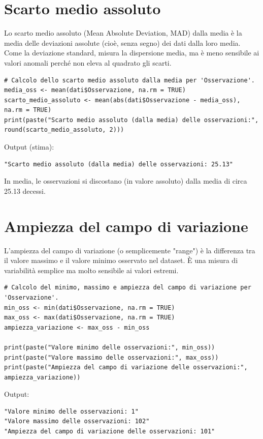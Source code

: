 \documentclass[14pt, openany, titlepage]{report} %
\begin{document}
\section{Scarto medio assoluto}
Lo scarto medio assoluto (Mean Absolute Deviation, MAD)
 dalla media è la media delle deviazioni assolute (cioè, senza segno)
  dei dati dalla loro media. Come la deviazione standard, 
  misura la dispersione media, ma è meno sensibile ai valori 
  anomali perché non eleva al quadrato gli scarti.
\begin{center}
\begin{lstlisting}[breaklines=true]
# Calcolo dello scarto medio assoluto dalla media per 'Osservazione'.
media_oss <- mean(dati$Osservazione, na.rm = TRUE)
scarto_medio_assoluto <- mean(abs(dati$Osservazione - media_oss), na.rm = TRUE)
print(paste("Scarto medio assoluto (dalla media) delle osservazioni:", round(scarto_medio_assoluto, 2)))
\end{lstlisting}
\end{center}
\noindent
Output (stima):
\begin{verbatim}
"Scarto medio assoluto (dalla media) delle osservazioni: 25.13"
\end{verbatim}
In media, le osservazioni si discostano (in valore assoluto) 
dalla media di circa 25.13 decessi.

\section{Ampiezza del campo di variazione}
L'ampiezza del campo di variazione (o semplicemente "range") 
è la differenza tra il valore massimo e il valore minimo osservato 
nel dataset. È una misura di variabilità semplice ma molto sensibile 
ai valori estremi.
\begin{center}
\begin{lstlisting}[breaklines=true]
# Calcolo del minimo, massimo e ampiezza del campo di variazione per 'Osservazione'.
min_oss <- min(dati$Osservazione, na.rm = TRUE)
max_oss <- max(dati$Osservazione, na.rm = TRUE)
ampiezza_variazione <- max_oss - min_oss 

print(paste("Valore minimo delle osservazioni:", min_oss))
print(paste("Valore massimo delle osservazioni:", max_oss))
print(paste("Ampiezza del campo di variazione delle osservazioni:", ampiezza_variazione))
\end{lstlisting}
\end{center}
\noindent
Output:
\begin{verbatim}
"Valore minimo delle osservazioni: 1" 
"Valore massimo delle osservazioni: 102" 
"Ampiezza del campo di variazione delle osservazioni: 101"
\end{verbatim}
\end{document}
